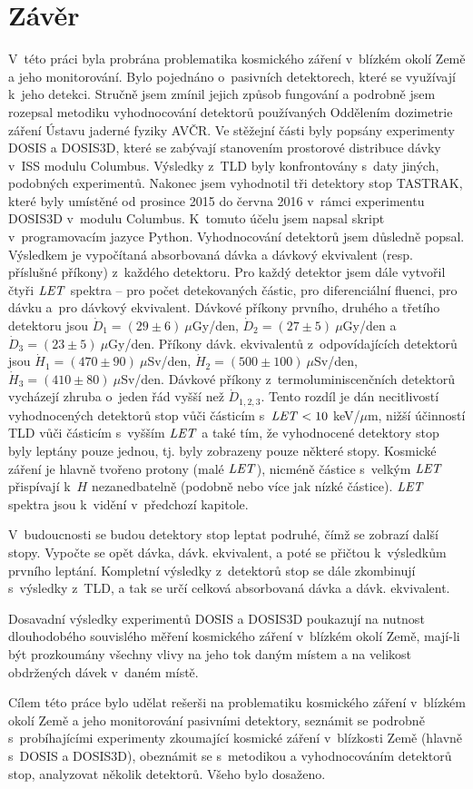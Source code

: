 \chapter*{Závěr}
V~této práci byla probrána problematika kosmického záření v~blízkém okolí Země a jeho monitorování. Bylo pojednáno o~pasivních detektorech, které se využívají k~jeho detekci. Stručně jsem zmínil jejich způsob fungování a podrobně jsem rozepsal metodiku vyhodnocování detektorů používaných Oddělením dozimetrie záření Ústavu jaderné fyziky AVČR. Ve stěžejní části byly popsány experimenty DOSIS a DOSIS3D, které se zabývají stanovením prostorové distribuce dávky v~ISS modulu Columbus. Výsledky z~TLD byly konfrontovány s~daty jiných, podobných experimentů. Nakonec jsem vyhodnotil tři detektory stop TASTRAK, které byly umístěné od prosince 2015 do června 2016 v~rámci experimentu DOSIS3D v~modulu Columbus. K~tomuto účelu jsem napsal skript v~programovacím jazyce Python.
Vyhodnocování detektorů jsem důsledně popsal. Výsledkem je vypočítaná absorbovaná dávka a dávkový ekvivalent (resp. příslušné příkony) z~každého detektoru. Pro každý detektor
jsem dále vytvořil čtyři $\mathit{LET}$ spektra -- pro počet detekovaných částic, pro diferenciální fluenci, pro dávku a~pro dávkový ekvivalent. Dávkové příkony prvního, druhého a třetího detektoru jsou $\dot{D}_1=(29\pm6)\ \mu$Gy/den, $\dot{D}_2=(27\pm5)\ \mu$Gy/den a $\dot{D}_3=(23\pm5)\ \mu$Gy/den. Příkony dávk. ekvivalentů z~odpovídajících detektorů jsou $\dot{H}_1=(470\pm90)\ \mu$Sv/den, $\dot{H}_2=(500\pm100)\ \mu$Sv/den, $\dot{H}_3=(410\pm80)\ \mu$Sv/den. Dávkové příkony z~termoluminiscenčních detektorů vycházejí zhruba o~jeden řád vyšší než $\dot{D}_{1,2,3}$. Tento rozdíl je dán necitlivostí vyhodnocených detektorů stop vůči částicím s~$\mathit{LET}<10$ keV/$\mu$m, nižší účinností TLD vůči částicím s~vyšším $\mathit{LET}$ a také tím, že vyhodnocené detektory stop byly leptány pouze jednou, tj. byly zobrazeny pouze některé stopy. Kosmické záření je
hlavně tvořeno protony (malé $\mathit{LET}$), nicméně částice s~velkým $\mathit{LET}$ přispívají k~$H$ nezanedbatelně (podobně nebo více jak nízké částice). $\mathit{LET}$ spektra jsou k~vidění v~předchozí kapitole.

V~budoucnosti se budou detektory stop leptat podruhé, čímž se zobrazí další stopy. Vypočte se opět dávka, dávk. ekvivalent, a poté se přičtou k~výsledkům prvního leptání. Kompletní výsledky z~detektorů stop se dále zkombinují s~výsledky z~TLD, a tak se určí celková absorbovaná dávka a dávk. ekvivalent. 

Dosavadní výsledky experimentů DOSIS a DOSIS3D poukazují na nutnost dlouhodobého souvislého měření kosmického záření v~blízkém okolí Země, mají-li být prozkoumány všechny vlivy na jeho tok daným místem a na velikost obdržených dávek v~daném místě.

Cílem této práce bylo udělat rešerši na problematiku kosmického záření v~blízkém okolí Země a jeho monitorování pasivními detektory, seznámit se podrobně s~probíhajícími experimenty zkoumající kosmické záření v~blízkosti Země (hlavně s~DOSIS a DOSIS3D), obeznámit se s~metodikou a vyhodnocováním detektorů stop, analyzovat několik detektorů. Všeho bylo dosaženo. 
